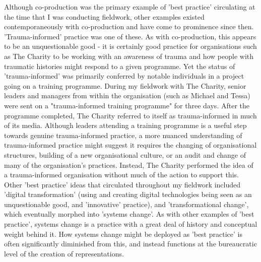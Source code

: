 Although co-production was the primary example of 'best practice' circulating at the time that I was conducting fieldwork, other examples existed contemporaneously with co-production and have come to prominence since then. 'Trauma-informed' practice was one of these. As with co-production, this appears to be an unquestionable good - it is certainly good practice for organisations such as The Charity to be working with an awareness of trauma and how people with traumatic histories might respond to a given programme. Yet the status of 'trauma-informed' was primarily conferred by notable individuals in a project going on a training programme. During my fieldwork with The Charity, senior  leaders and managers from within the organisation (such as Michael and Tessa) were sent on a "trauma-informed training programme" for three days. After the programme completed, The Charity referred to itself as trauma-informed in much of its media. Although leaders attending a training programme is a useful step towards genuine trauma-informed practice, a more nuanced understanding of trauma-informed practice might suggest it requires the changing of organisational structures, building of a new organisational culture, or an audit and change of many of the organisation's practices.  Instead, The Charity performed the idea of a trauma-informed organisation without much of the action to support this. Other 'best practice' ideas that circulated throughout my fieldwork included 'digital transformation' (using and creating digital technologies being seen as an unquestionable good, and 'innovative' practice), and 'transformational change', which eventually morphed into 'systems change'. As with other examples of 'best practice', systems change is a practice with a great deal of history and conceptual weight behind it. How systems change might be deployed as 'best practice' is often significantly diminished from this, and instead functions at the bureaucratic level of the creation of representations. 


